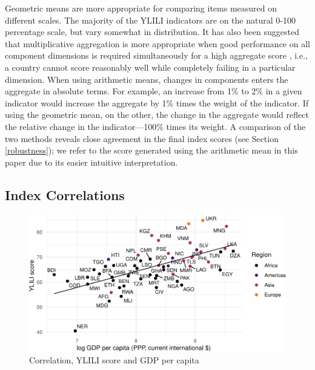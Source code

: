 \documentclass[
  a4paper, twoside, 12pt]{book}
\begin{document}
Geometric means are more appropriate for comparing items measured on different scales. The majority of the YLILI indicators are on the natural 0-100 percentage scale, but vary somewhat in distribution. It has also been suggested that multiplicative aggregation is more appropriate when good performance on all component dimensions is required simultaneously for a high aggregate score \autocite{sagar1998}, i.e., a country cannot score reasonably well while completely failing in a particular dimension. When using arithmetic means, changes in components enters the aggregate in absolute terms. For example, an increase from 1\% to 2\% in a given indicator would increase the aggregate by 1\% times the weight of the indicator. If using the geometric mean, on the other, the change in the aggregate would reflect the relative change in the indicator---100\% times its weight. A comparison of the two methods reveals close agreement in the final index scores (see Section \ref{robustness}); we refer to the score generated using the arithmetic mean in this paper due to its easier intuitive interpretation.

\hypertarget{correlations}{%
\subsection*{Index Correlations}\label{correlations}}


\begin{figure}[H]

{\centering \includegraphics{figures/fig-indexgdp-1} 

}

\caption{Correlation, YLILI score and GDP per capita}\label{fig:fig-indexgdp}
\end{figure}
\end{document}
